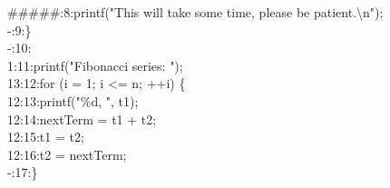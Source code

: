 \documentclass [11pt, a4wide, twoside]{article}
\begin{document}
{\#\#\#\#\#:\hspace{0.74cm}8:\hspace*{0.75cm}\hspace*{1.0cm}printf("This will take some time, please be patient.\textbackslash n");\\
\hspace*{0.925cm}-:\hspace*{0.74cm}9:\hspace*{0.75cm}\hspace*{0.5cm}\}\\
\hspace*{0.925cm}-:\hspace*{0.5cm}10:\\
\hspace*{0.925cm}1:\hspace*{0.5cm}11:\hspace*{0.75cm}\hspace*{0.5cm}printf("Fibonacci series: ");\\
\hspace*{0.7cm}13:\hspace*{0.5cm}12:\hspace*{0.75cm}\hspace*{0.5cm}for (i = 1; i \textless= n; ++i) \{\\
\hspace*{0.7cm}12:\hspace*{0.5cm}13:\hspace*{0.75cm}\hspace*{1.0cm}printf("\%d, ", t1);\\
\hspace*{0.7cm}12:\hspace*{0.5cm}14:\hspace*{0.75cm}\hspace*{1.0cm}nextTerm = t1 + t2;\\
\hspace*{0.7cm}12:\hspace*{0.5cm}15:\hspace*{0.75cm}\hspace*{1.0cm}t1 = t2;\\
\hspace*{0.7cm}12:\hspace*{0.5cm}16:\hspace*{0.75cm}\hspace*{1.0cm}t2 = nextTerm;\\
\hspace*{0.925cm}-:\hspace*{0.5cm}17:\hspace*{0.75cm}\hspace*{0.5cm}\}\\
}
\end{document}
